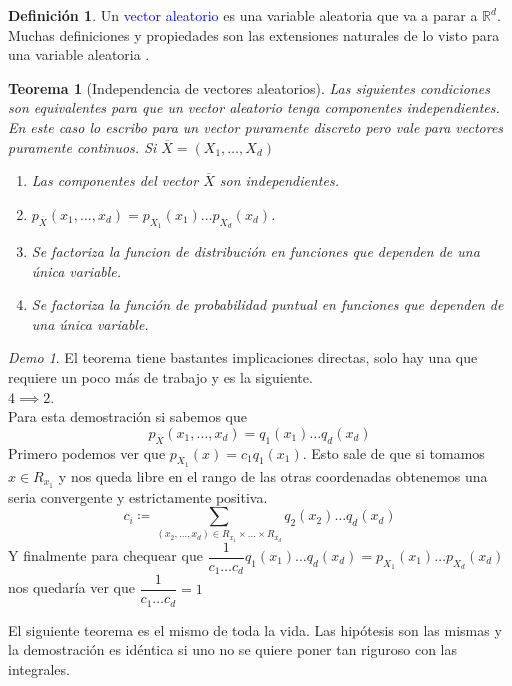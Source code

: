 \documentclass[11pt]{article}
\theoremstyle{plain} %
\newtheorem{teorema}{Teorema}
\theoremstyle{definition}
\newtheorem*{definicion}{Definici\'{o}n} %
\theoremstyle{remark}
\newtheorem*{demo}{Demo}
\def\R{\mathbb{R}}
\def\va{variable aleatoria }
\def\blue{\textcolor{blue}}
\renewcommand\qed{\ding{110}}
\newcommand{\X}{\overline{X}}
\begin{document}
\begin{definicion}
	Un \blue{vector aleatorio} es una \va que va a parar a $\R^d$. Muchas definiciones y propiedades son las extensiones naturales de lo visto para una \va.
\end{definicion}

\begin{teorema}
	[Independencia de vectores aleatorios]
	Las siguientes condiciones son equivalentes para que un vector aleatorio tenga componentes independientes. En este caso lo escribo para un vector puramente discreto pero vale para vectores puramente continuos. Si $\overline{X} = \left( X_1, \dots , X_d \right)$
	\begin{enumerate}
		\item Las componentes del vector $\X$ son independientes.
		\item $p_{\X} (x_1,\dots,x_d) = p_{X_1}(x_1) \dots p_{X_d}(x_d)$.
		\item  Se factoriza la funcion de distribuci\'on en funciones que dependen de una \'unica variable.
		\item Se factoriza la funci\'on de probabilidad puntual en funciones que dependen de una \'unica variable.
		
	\end{enumerate}
\end{teorema}

\begin{demo}
	El teorema tiene bastantes implicaciones directas, solo hay una que requiere un poco m\'as de trabajo y es la siguiente.\\
	$4 \implies 2$.\\
	Para esta demostraci\'on si sabemos que 
	\[p_{\X} (x_1,\dots,x_d) = q_{1}(x_1) \dots q_{d}(x_d)\]
	Primero podemos ver que $p_{X_1}(x) = c_{1}q_{1}(x_1)$. Esto sale de que si tomamos $x \in R_{x_1}$ y nos queda libre en el rango de las otras coordenadas obtenemos una seria convergente y estrictamente positiva.
	\[c_i \coloneqq \sum_{(x_2, \dots, x_d) \in R_{x_1} \times \dots \times R_{x_d}} q_{2}(x_2) \dots q_{d}(x_d)  \]
	Y finalmente para chequear  que $\dfrac{1}{c_1\dots c_d}q_{1}(x_1) \dots q_{d}(x_d) = p_{X_{1}}(x_1) \dots p_{X_d}(x_d)$ nos quedar\'ia ver que $\dfrac{1}{c_1\dots c_d}=1$ \qed
\end{demo}

El siguiente teorema es el mismo de toda la vida. Las hipótesis son las mismas y la demostración es idéntica si uno no se quiere poner tan riguroso con las integrales.
\end{document}
